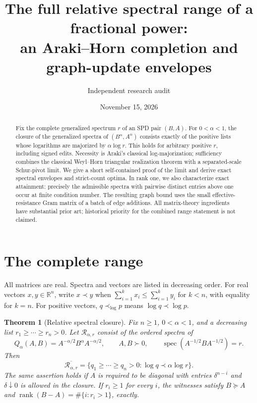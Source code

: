 \documentclass[11pt]{article}
\title{The full relative spectral range of a fractional power:\\an Araki--Horn completion and graph-update envelopes}
\author{Independent research audit}
\date{November 15, 2026}
\newtheorem{theorem}{Theorem}[section]
\newcommand{\spec}{\operatorname{spec}}
\newcommand{\rank}{\operatorname{rank}}
\begin{document}
\maketitle

\begin{abstract}
Fix the complete generalized spectrum $r$ of an SPD pair $(B,A)$.
For $0<\alpha<1$, the closure of the generalized spectra of
$(B^\alpha,A^\alpha)$ consists exactly of the positive lists whose
logarithms are majorized by $\alpha\log r$. This holds for arbitrary
positive $r$, including signed edits. Necessity is Araki's classical
log-majorization; sufficiency combines the classical Weyl--Horn
triangular realization theorem with a separated-scale Schur-pivot
limit. We give a short self-contained proof of the limit and derive
exact spectral envelopes and strict-count optima. In rank one, we also
characterize exact attainment: precisely the admissible spectra with
pairwise distinct entries above one occur at finite condition number.
The resulting graph
bound uses the small effective-resistance Gram matrix of a batch of
edge additions. All matrix-theory ingredients have substantial prior
art; historical priority for the combined range statement is not claimed.
\end{abstract}

\section{The complete range}
All matrices are real. Spectra and vectors are listed in decreasing
order. For real vectors $x,y\in\mathbb R^n$, write $x\prec y$ when
$\sum_{i=1}^k x_i\le\sum_{i=1}^k y_i$ for $k<n$, with equality
for $k=n$. For positive vectors, $q\prec_{\log}p$ means
$\log q\prec\log p$.

\begin{theorem}[Relative spectral closure]\label{thm:range}
Fix $n\ge1$, $0<\alpha<1$, and a decreasing list
$r_1\ge\cdots\ge r_n>0$. Let $\mathcal R_{\alpha,r}$ consist of
the ordered spectra of
\[
 Q_\alpha(A,B)=A^{-\alpha/2}B^\alpha A^{-\alpha/2},
 \qquad A,B\succ0,
 \qquad \spec(A^{-1/2}BA^{-1/2})=r.
\]
Then
\[
 \overline{\mathcal R_{\alpha,r}}
 =\{q_1\ge\cdots\ge q_n>0:\log q\prec\alpha\log r\}.
\]
The same assertion holds if $A$ is required to be diagonal with entries
$\delta^{n-i}$ and $\delta\downarrow0$ is allowed in the closure.
If $r_i\ge1$ for every $i$, the witnesses satisfy $B\succeq A$ and
$\rank(B-A)=\#\{i:r_i>1\}$, exactly.
\end{theorem}
\end{document}
